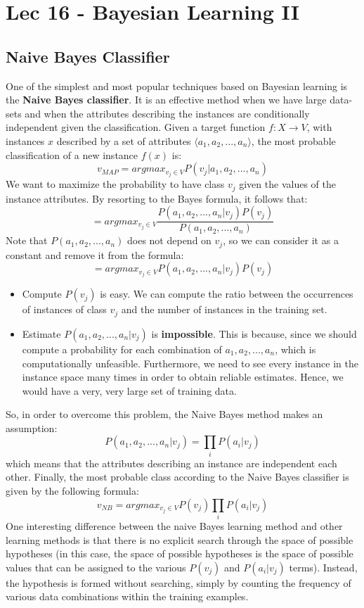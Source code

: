\chapter{Lec 16 - Bayesian Learning II}

\section{Naive Bayes Classifier}
One of the simplest and most popular techniques based on Bayesian learning is the \textbf{Naive Bayes classifier}. It is an effective method when we have large data-sets and when the attributes describing the instances are conditionally independent given the classification.\newline\newline
Given a target function $f: X \rightarrow V$, with instances $x$ described by a set of attributes $\langle a_{1}, a_{2},...,a_{n}\rangle$, the most probable classification of a new instance $f(x)$ is:
\[v_{MAP} = argmax_{v_{j} \in V}P(v_{j} | a_{1}, a_{2},...,a_{n})\]
We want to maximize the probability to have class $v_{j}$ given the values of the instance attributes. By resorting to the Bayes formula, it follows that:
\[= argmax_{v_{j} \in V} \frac{P(a_{1}, a_{2},...,a_{n} | v_{j})P(v_{j})}{P(a_{1}, a_{2},...,a_{n})}\]
Note that $P(a_{1}, a_{2},...,a_{n})$ does not depend on $v_{j}$, so we can consider it as a constant and remove it from the formula:
\[= argmax_{v_{j} \in V} P(a_{1}, a_{2},...,a_{n} | v_{j})P(v_{j})\]
\begin{itemize}
    \item Compute $P(v_{j})$ is easy. We can compute the ratio between the occurrences of instances of class $v_{j}$ and the number of instances in the training set.

    \item Estimate $P(a_{1}, a_{2},...,a_{n} | v_{j})$ is \textbf{impossible}. This is because, since we should compute a probability for each combination of $a_{1}, a_{2},...,a_{n}$, which is computationally unfeasible. Furthermore, we need to see every  instance in the instance space many times in order to obtain reliable estimates. Hence, we would have a very, very large set of training data.
\end{itemize}
So, in order to overcome this problem, the Naive Bayes method makes an assumption:
\[P(a_{1}, a_{2},...,a_{n} | v_{j}) = \prod_{i}P(a_{i}|v_{j})\]
which means that the attributes describing an instance are independent each other.\newline\newline
Finally, the most probable class according to the Naive Bayes classifier is given by the following formula:
\[v_{NB} = argmax_{v_{j} \in V}P(v_{j})\prod_{i}P(a_{i}|v_{j})\]
One interesting difference between the naive Bayes learning method and other learning methods is that there is no explicit search through the space of possible hypotheses (in this case,  the  space of possible hypotheses is the space of possible values that can be assigned to the various $P(v_j)$ and $P(a_i|v_j)$ terms). Instead, the hypothesis is formed without searching, simply by counting the frequency of various data combinations within the training examples.

